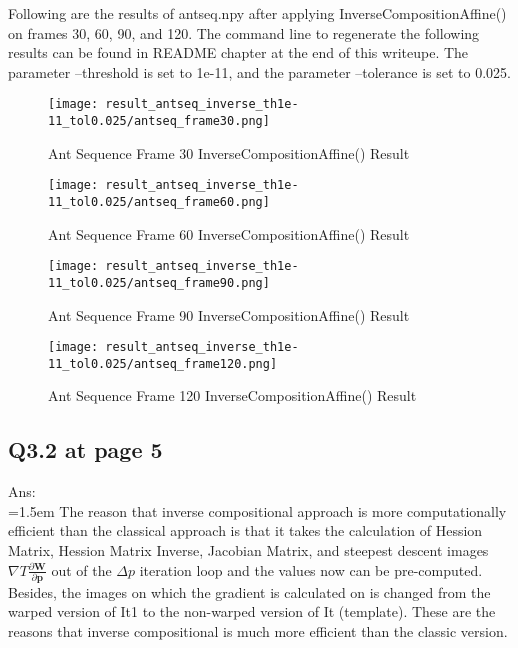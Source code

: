\documentclass{article}
\begin{document}
	 Following are the results of antseq.npy after applying InverseCompositionAffine() on frames 30, 60, 90, and 120. The command line to regenerate the following results can be found in README chapter at the end of this writeupe. The parameter --threshold is set to 1e-11, and the parameter --tolerance is set to 0.025.
	\begin{figure}[H]
	\centering
	\begin{minipage}[b]{0.45\textwidth}
		\centering
		\texttt{[image: result\_antseq\_inverse\_th1e-11\_tol0.025/antseq\_frame30.png]}  %
		\caption{Ant Sequence Frame 30 InverseCompositionAffine() Result}
		\label{fig:Q3_1_frame_30_result}
	\end{minipage}
	\hfill  %
	\begin{minipage}[b]{0.45\textwidth}
		\centering
		\texttt{[image: result\_antseq\_inverse\_th1e-11\_tol0.025/antseq\_frame60.png]}  %
		\caption{Ant Sequence Frame 60 InverseCompositionAffine() Result}
		\label{fig:Q3_1_frame_60_result}
	\end{minipage}	
	\end{figure}
	\begin{figure}[H]
	\centering
	\begin{minipage}[b]{0.45\textwidth}
		\centering
		\texttt{[image: result\_antseq\_inverse\_th1e-11\_tol0.025/antseq\_frame90.png]}  %
		\caption{Ant Sequence Frame 90 InverseCompositionAffine() Result}
		\label{fig:Q3_1_frame_90_result}
	\end{minipage}
	\hfill  %
	\begin{minipage}[b]{0.45\textwidth}
		\centering
		\texttt{[image: result\_antseq\_inverse\_th1e-11\_tol0.025/antseq\_frame120.png]}  %
		\caption{Ant Sequence Frame 120 InverseCompositionAffine() Result}
		\label{fig:Q3_1_frame_120_result}
	\end{minipage}	
	\end{figure}
	
	\newpage
	\subsection*{Q3.2 at page 5}
	Ans:\\
	\hangindent=1.5em \hspace{1.5em} The reason that inverse compositional approach is more computationally efficient than the classical approach is that it takes the calculation of Hession Matrix, Hession Matrix Inverse, Jacobian Matrix, and steepest descent images $\nabla T \frac{\partial \mathbf{W}}{\partial \mathbf{p}}$ out of the $\Delta p$ iteration loop and the values now can be pre-computed. Besides, the images on which the gradient is calculated on is changed from the warped version of It1 to the non-warped version of It (template). These are the reasons that inverse compositional is much more efficient than the classic version.
	
\end{document}
